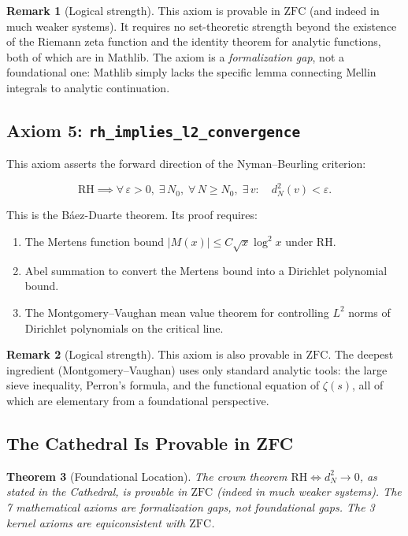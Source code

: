 \documentclass[11pt,a4paper]{article}
\theoremstyle{plain}
\newtheorem{theorem}{Theorem}[section]
\theoremstyle{definition}
\newtheorem{remark}[theorem]{Remark}
\newcommand{\lean}[1]{\texttt{#1}}
\newcommand{\RH}{\ensuremath{\mathrm{RH}}}
\newcommand{\ZFC}{\mathrm{ZFC}}
\begin{document}
\begin{remark}[Logical strength]
This axiom is provable in $\ZFC$ (and indeed in much weaker systems).
It requires no set-theoretic strength beyond the existence of the
Riemann zeta function and the identity theorem for analytic functions,
both of which are in Mathlib. The axiom is a \emph{formalization gap},
not a foundational one: Mathlib simply lacks the specific lemma
connecting Mellin integrals to analytic continuation.
\end{remark}

\subsection{Axiom 5: \lean{rh\_implies\_l2\_convergence}}

This axiom asserts the forward direction of the Nyman--Beurling
criterion:

\[
  \RH \implies \forall\,\varepsilon > 0,\;\exists\,N_0,\;
  \forall\,N \geq N_0,\;\exists\,v :\quad d_N^2(v) < \varepsilon.
\]

This is the B\'aez-Duarte theorem. Its proof requires:

\begin{enumerate}
  \item The Mertens function bound $|M(x)| \leq C\sqrt{x}\log^2 x$
    under \RH.
  \item Abel summation to convert the Mertens bound into a
    Dirichlet polynomial bound.
  \item The Montgomery--Vaughan mean value theorem for controlling
    $L^2$ norms of Dirichlet polynomials on the critical line.
\end{enumerate}

\begin{remark}[Logical strength]
This axiom is also provable in $\ZFC$. The deepest ingredient
(Montgomery--Vaughan) uses only standard analytic tools: the large
sieve inequality, Perron's formula, and the functional equation of
$\zeta(s)$, all of which are elementary from a foundational
perspective.
\end{remark}

\subsection{The Cathedral Is Provable in ZFC}

\begin{theorem}[Foundational Location]
\label{thm:zfc}
The crown theorem $\RH \iff d_N^2 \to 0$, as stated in the
Cathedral, is provable in $\ZFC$ (indeed in much weaker systems).
The 7 mathematical axioms are formalization gaps, not foundational
gaps. The 3 kernel axioms are equiconsistent with $\ZFC$.
\end{theorem}
\end{document}
